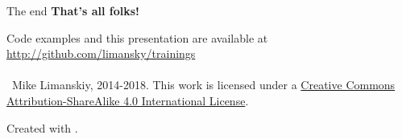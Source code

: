 \begin{frame}{The end}
\centering
\textbf{That's all folks!}

Code examples and this presentation are available at \url{http://github.com/limansky/trainings}\\~\\

\scriptsize{\ccbysa \ Mike Limanskiy, 2014-2018.}
\vfill
\tiny
This work is licensed under a \href{http://creativecommons.org/licenses/by-sa/4.0/}{Creative Commons Attribution-ShareAlike 4.0 International License}.

Created with \LaTeXe.
\end{frame}


